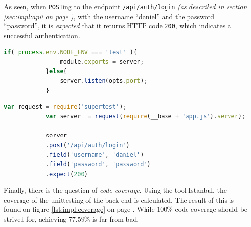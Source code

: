 		As seen, when \verb=POST=ing to the endpoint \verb=/api/auth/login= \emph{(as described in section \ref{sec:impl:api} on page \pageref{sec:impl:api})}, with the username ``daniel'' and the password ``password'', it is \emph{expected} that it returns HTTP code \verb=200=, which indicates a successful authentication.


		\begin{lstlisting}[language=Javascript,gobble=12,caption={Application's export of primary variable, when in test environment},label={lst:impl:backend:testexport}]
            if( process.env.NODE_ENV === 'test' ){
                module.exports = server;
            }else{
                server.listen(opts.port);
            }
        \end{lstlisting}

		\begin{lstlisting}[language=Javascript,gobble=12,caption={Unittesting API endpoints, using Supertest},label={lst:impl:backend:supertest}]
            var request = require('supertest');  
            var server  = request(require(__base + 'app.js').server);
            
            server
            .post('/api/auth/login')
            .field('username', 'daniel')
            .field('password', 'password')
            .expect(200)
		\end{lstlisting}

		Finally, there is the question of \emph{code coverage}. Using the tool Istanbul, the coverage of the unittesting of the back-end is calculated. The result of this is found on figure \ref{lst:impl:coverage} on page \pageref{lst:impl:coverage}. While $100\%$ code coverage should be strived for, achieving $77.59\%$ is far from bad.

		

































